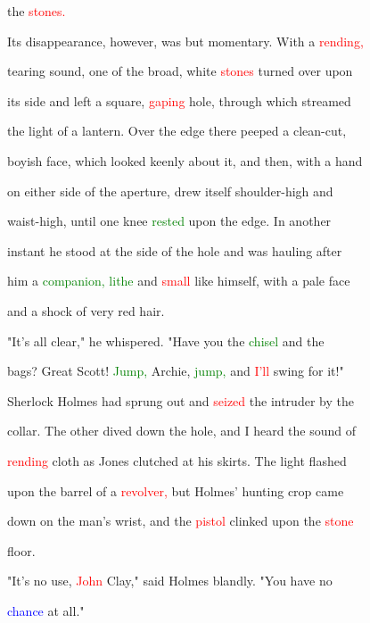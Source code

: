  the \textcolor{red}{stones.}



 Its disappearance, however, was but momentary. With a \textcolor{red}{rending,}

 tearing sound, one of the broad, \textcolor{BurntOrange}{white} \textcolor{red}{stones} turned over upon

 its side and left a square, \textcolor{red}{gaping} hole, through which streamed

 the light of a lantern. Over the edge there peeped a clean-cut,

 boyish face, which looked keenly about it, and then, with a hand

 on either side of the aperture, drew itself shoulder-high and

 waist-high, until one knee \textcolor{green}{rested} upon the edge. In another

 instant he stood at the side of the hole and was hauling after

 him a \textcolor{green}{companion,} \textcolor{green}{lithe} and \textcolor{red}{small} like himself, with a pale face

 and a \textcolor{BurntOrange}{shock} of very red hair.



 "It's all clear," he whispered. "Have you the \textcolor{green}{chisel} and the

 bags? Great Scott! \textcolor{green}{Jump,} Archie, \textcolor{green}{jump,} and \textcolor{red}{I'll} swing for it!"



 Sherlock Holmes had sprung out and \textcolor{red}{seized} the \textcolor{BurntOrange}{intruder} by the

 collar. The other dived down the hole, and I heard the sound of

 \textcolor{red}{rending} cloth as Jones clutched at his skirts. The light flashed

 upon the barrel of a \textcolor{red}{revolver,} but Holmes' hunting crop came

 down on the man's wrist, and the \textcolor{red}{pistol} clinked upon the \textcolor{red}{stone}

 floor.



 "It's no use, \textcolor{red}{John} Clay," said Holmes blandly. "You have no

 \textcolor{blue}{chance} at all."



